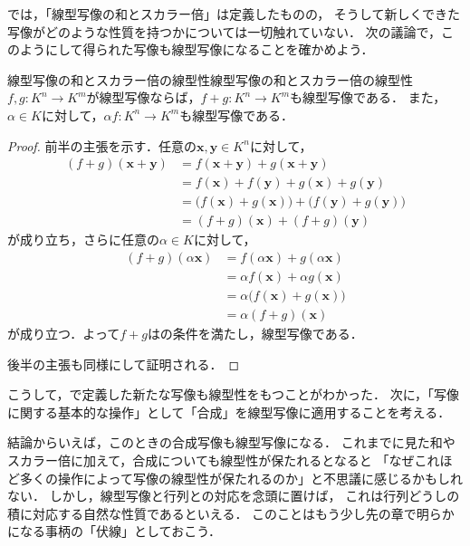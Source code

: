 では，「線型写像の和とスカラー倍」は定義したものの，
そうして新しくできた写像がどのような性質を持つかについては一切触れていない．
次の議論で，このようにして得られた写像も線型写像になることを確かめよう．

\begin{prop}{線型写像の和とスカラー倍の線型性}{線型写像の和とスカラー倍の線型性}
  $f, g \colon K^n \to K^m$が線型写像ならば，$f + g \colon K^n \to K^m$も線型写像である．
  また，$\alpha \in K$に対して，$\alpha f \colon K^n \to K^m$も線型写像である．
\end{prop}

\begin{tleftbar}
\begin{proof}
  前半の主張を示す．任意の$\bm{x}, \bm{y} \in K^n$に対して，
  \begin{align}
    (f + g)(\bm{x} + \bm{y}) &= f(\bm{x} + \bm{y}) + g(\bm{x} + \bm{y}) \tag{$f+g$の定義} \\
    &= f(\bm{x}) + f(\bm{y}) + g(\bm{x}) + g(\bm{y}) \tag{$f,g$の線型性} \\
    &= \bigl(f(\bm{x}) + g(\bm{x})\bigr) + \bigl(f(\bm{y}) + g(\bm{y})\bigr) \nonumber \\
    &= (f + g)(\bm{x}) + (f + g)(\bm{y}) \tag{$f+g$の定義}
  \end{align}
  が成り立ち，さらに任意の$\alpha \in K$に対して，
  \begin{align}
    (f + g)(\alpha\bm{x}) &= f(\alpha\bm{x}) + g(\alpha\bm{x}) \tag{$f+g$の定義} \\
    &= \alpha f(\bm{x}) + \alpha g(\bm{x}) \tag{$f,g$の線型性} \\
    &= \alpha\bigl(f(\bm{x}) + g(\bm{x})\bigr) \nonumber \\
    &= \alpha(f + g)(\bm{x}) \tag{$f+g$の定義}
  \end{align}
  が成り立つ．よって$f + g$はの条件を満たし，線型写像である．

  後半の主張も同様にして証明される．
\end{proof}
\end{tleftbar}

こうして，で定義した新たな写像も線型性をもつことがわかった．
次に，「写像に関する基本的な操作」として「合成」を線型写像に適用することを考える．

結論からいえば，このときの合成写像も線型写像になる．
これまでに見た和やスカラー倍に加えて，合成についても線型性が保たれるとなると
「なぜこれほど多くの操作によって写像の線型性が保たれるのか」と不思議に感じるかもしれない．
しかし，線型写像と行列との対応を念頭に置けば，
これは行列どうしの積に対応する自然な性質であるといえる．
このことはもう少し先の章で明らかになる事柄の「伏線」としておこう．

